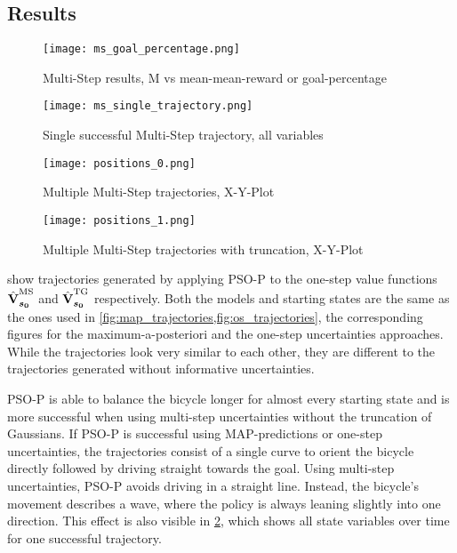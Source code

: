 \subsection{Results}
\begin{figure}[p]
    \centering
    \texttt{[image: ms\_goal\_percentage.png]}
    \caption{Multi-Step results, M vs mean-mean-reward or goal-percentage}
    \label{fig:ms_results}
\end{figure}
\begin{figure}[p]
    \centering
    \texttt{[image: ms\_single\_trajectory.png]}
    \caption{Single successful Multi-Step trajectory, all variables}
    \label{fig:ms_successful_trajectory}
\end{figure}
\begin{figure}[p]
    \centering
    \texttt{[image: positions\_0.png]}
    \caption{Multiple Multi-Step trajectories, X-Y-Plot}
    \label{fig:ms_trajectories}
\end{figure}
\begin{figure}[p]
    \centering
    \texttt{[image: positions\_1.png]}
    \caption{Multiple Multi-Step trajectories with truncation, X-Y-Plot}
    \label{fig:ms_truncation_trajectories}
\end{figure}
 show trajectories generated by applying PSO-P to the one-step value functions $\operatorname{\hat{\operatorname{\mathbf{V}}}}^{\text{MS}}_{\bm{s_0}}$ and $\operatorname{\hat{\operatorname{\mathbf{V}}}}^{\text{TG}}_{\bm{s_0}}$ respectively.
Both the models and starting states are the same as the ones used in \cref{fig:map_trajectories,fig:os_trajectories}, the corresponding figures for the maximum-a-posteriori and the one-step uncertainties approaches.
While the trajectories look very similar to each other, they are different to the trajectories generated without informative uncertainties.

PSO-P is able to balance the bicycle longer for almost every starting state and is more successful when using multi-step uncertainties without the truncation of Gaussians.
If PSO-P is successful using MAP-predictions or one-step uncertainties, the trajectories consist of a single curve to orient the bicycle directly followed by driving straight towards the goal.
Using multi-step uncertainties, PSO-P avoids driving in a straight line.
Instead, the bicycle's movement describes a wave, where the policy is always leaning slightly into one direction.
This effect is also visible in \cref{fig:ms_successful_trajectory}, which shows all state variables over time for one successful trajectory.

